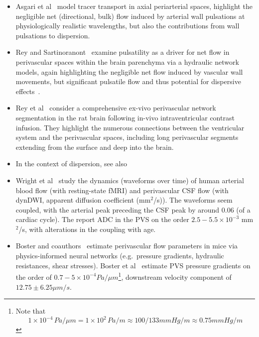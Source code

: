\documentclass[fleqn,10pt]{wlscirep}
\begin{document}
\begin{enumerate}
\begin{itemize}
\item
  Asgari et al~\cite{asgari2016glymphatic} model tracer transport in axial periarterial spaces, highlight the negligible net (directional, bulk) flow induced by arterial wall pulsations at physiologically realistic wavelengths, but also the contributions from wall pulsations to dispersion. 
\item
  Rey and Sartinoranont~\cite{rey2018pulsatile} examine pulsatility as a driver for net flow in perivascular spaces within the brain parenchyma via a hydraulic network models, again highlighting the negligible net flow induced by vascular wall movements, but significant pulsatile flow and thus potential for dispersive effects~\cite{watson1983diffusion, asgari2016glymphatic}.
\item
  Rey et al~\cite{rey2023perivascular} consider a comprehensive ex-vivo perivascular network segmentation in the rat brain following in-vivo intraventricular contrast infusion. They highlight the numerous connections between the ventricular system and the perivascular spaces, including long perivascular segments extending from the surface and deep into the brain. 
\item
  In the context of dispersion, see also~\cite{asgari2016glymphatic, keith2019dispersion, troyetsky2021dispersion}
\item
  Wright et al~\cite{wright2024coupled} study the dynamics (waveforms over time) of human arterial blood flow (with resting-state fMRI) and perivascular CSF flow (with dynDWI, apparent diffusion coefficient (mm$^2$/s)). The waveforms seem coupled, with the arterial peak preceding the CSF peak by around 0.06 (of a cardiac cycle). The report ADC in the PVS on the order $2.5-5.5 \times 10^{-3}$ mm$^2$/s, with alterations in the coupling with age.
\item
  Boster and coauthors~\cite{boster2023artificial, toscano2024infeering} estimate perivascular flow parameters in mice via physics-informed neural networks (e.g.~pressure gradients, hydraulic resistances, shear stresses). Boster et al~\cite{boster2023artificial} estimate PVS pressure gradients on the order of $0.7-5 \times 10^{-4} \unit{Pa/\mu m}$\footnote{Note that 
  \begin{equation}
    1 \times 10^{-4} \, \unit{Pa/\mu m} = 1 \times 10^{2} \, \unit{Pa/m} \approx 100/133 \unit{mmHg/m} \approx 0.75 \unit{mmHg/m}
  \end{equation}
   }, downstream velocity component of $12.75 \pm 6.25 \unit{\mu m/s}$. 
  \end{itemize}

\end{enumerate}
\end{document}
